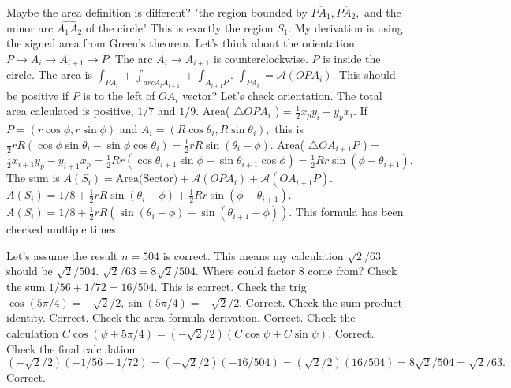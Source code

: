 Maybe the area definition is different? 
"the region bounded by $\overline{PA_1},\overline{PA_2},$ and the minor arc $\widehat{A_1A_2}$ of the circle" 
This is exactly the region $S_1.$ 
My derivation is using the signed area from Green's theorem. Let's think about the orientation. 
$P \to A_i \to A_{i+1} \to P.$ The arc $A_i \to A_{i+1}$ is counterclockwise. $P$ is inside the circle. 
The area is $\int_{PA_i} + \int_{arc A_iA_{i+1}} + \int_{A_{i+1}P}.$ 
$\int_{PA_i} = \mathcal{A}(OPA_i).$ This should be positive if $P$ is to the left of $OA_i$ vector? Let's check orientation. The total area calculated is positive, $1/7$ and $1/9.$ 
Area( $\triangle OPA_i$ ) = $\frac{1}{2} x_p y_i - y_p x_i.$ If $P=(r\cos\phi, r\sin\phi)$ and $A_i=(R\cos\theta_i, R\sin\theta_i),$ this is $\frac{1}{2} r R (\cos\phi \sin\theta_i - \sin\phi \cos\theta_i) = \frac{1}{2} rR \sin(\theta_i-\phi).$ 
Area( $\triangle OA_{i+1}P$ ) = $\frac{1}{2} x_{i+1} y_p - y_{i+1} x_p = \frac{1}{2} R r (\cos\theta_{i+1}\sin\phi - \sin\theta_{i+1}\cos\phi) = \frac{1}{2} Rr \sin(\phi - \theta_{i+1}).$ 
The sum is $A(S_i) = \text{Area(Sector)} + \mathcal{A}(OPA_i) + \mathcal{A}(OA_{i+1}P).$ 
$A(S_i) = 1/8 + \frac{1}{2} rR \sin(\theta_i-\phi) + \frac{1}{2} Rr \sin(\phi - \theta_{i+1}).$ 
$A(S_i) = 1/8 + \frac{1}{2} rR (\sin(\theta_i-\phi) - \sin(\theta_{i+1}-\phi)).$ 
This formula has been checked multiple times.

Let's assume the result $n=504$ is correct. This means my calculation $\sqrt{2}/63$ should be $\sqrt{2}/504.$ 
$\sqrt{2}/63 = 8\sqrt{2}/504.$ 
Where could factor 8 come from? 
Check the sum $1/56 + 1/72 = 16/504.$ This is correct. 
Check the trig $\cos(5\pi/4)=-\sqrt{2}/2, \sin(5\pi/4)=-\sqrt{2}/2.$ Correct. 
Check the sum-product identity. Correct. 
Check the area formula derivation. Correct. 
Check the calculation $C \cos(\psi + 5\pi/4) = (-\sqrt{2}/2) (C \cos\psi + C \sin\psi).$ Correct. 
Check the final calculation $(-\sqrt{2}/2) (-1/56 - 1/72) = (-\sqrt{2}/2) (-16/504) = (\sqrt{2}/2) (16/504) = 8\sqrt{2}/504 = \sqrt{2}/63.$ Correct.

